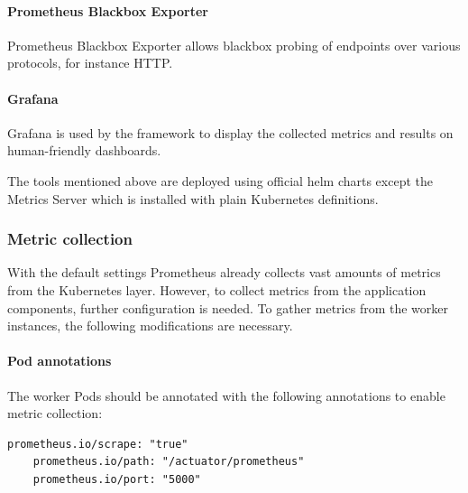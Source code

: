 \paragraph{Prometheus Blackbox Exporter} Prometheus Blackbox Exporter allows blackbox probing of endpoints over various protocols, for instance HTTP.

\paragraph{Grafana} Grafana is used by the framework to display the collected metrics and results on human-friendly dashboards.

The tools mentioned above are deployed using official helm charts \cite{PrometheusChart} \cite{PrometheusAdapterChart} \cite{BlackboxExporterChart} \cite{GrafanaChart} except the Metrics Server which is installed with plain Kubernetes definitions. 

\subsubsection{Metric collection}


With the default settings Prometheus already collects vast amounts of metrics from the Kubernetes layer. However, to collect metrics from the application components, further configuration is needed. To gather metrics from the worker instances, the following modifications are necessary.

\paragraph{Pod annotations} The worker Pods should be annotated with the following annotations to enable metric collection:

\vspace{0.5cm}
\begin{minipage}{\linewidth}
	\begin{lstlisting}[caption={Worker annotation to enable monitoring}, label={lst:worker-annotation-monitoring}]
	prometheus.io/scrape: "true"
	prometheus.io/path: "/actuator/prometheus"
	prometheus.io/port: "5000"
	\end{lstlisting}
\end{minipage}

